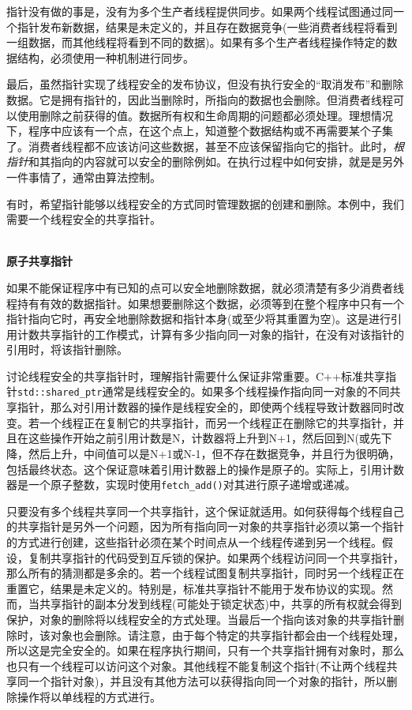 指针没有做的事是，没有为多个生产者线程提供同步。如果两个线程试图通过同一个指针发布新数据，结果是未定义的，并且存在数据竞争(一些消费者线程将看到一组数据，而其他线程将看到不同的数据)。如果有多个生产者线程操作特定的数据结构，必须使用一种机制进行同步。

最后，虽然指针实现了线程安全的发布协议，但没有执行安全的“取消发布”和删除数据。它是拥有指针的，因此当删除时，所指向的数据也会删除。但消费者线程可以使用删除之前获得的值。数据所有权和生命周期的问题都必须处理。理想情况下，程序中应该有一个点，在这个点上，知道整个数据结构或不再需要某个子集了。消费者线程都不应该访问这些数据，甚至不应该保留指向它的指针。此时，\textit{根指针}和其指向的内容就可以安全的删除例如。在执行过程中如何安排，就是是另外一件事情了，通常由算法控制。

有时，希望指针能够以线程安全的方式同时管理数据的创建和删除。本例中，我们需要一个线程安全的共享指针。

\hspace*{\fill} \\ %
\noindent
\textbf{原子共享指针}

如果不能保证程序中有已知的点可以安全地删除数据，就必须清楚有多少消费者线程持有有效的数据指针。如果想要删除这个数据，必须等到在整个程序中只有一个指针指向它时，再安全地删除数据和指针本身(或至少将其重置为空)。这是进行引用计数共享指针的工作模式，计算有多少指向同一对象的指针，在没有对该指针的引用时，将该指针删除。

讨论线程安全的共享指针时，理解指针需要什么保证非常重要。C++标准共享指针\texttt{std::shared\_ptr}通常是线程安全的。如果多个线程操作指向同一对象的不同共享指针，那么对引用计数器的操作是线程安全的，即使两个线程导致计数器同时改变。若一个线程正在复制它的共享指针，而另一个线程正在删除它的共享指针，并且在这些操作开始之前引用计数是N，计数器将上升到N+1，然后回到N(或先下降，然后上升，中间值可以是N+1或N-1，但不存在数据竞争，并且行为很明确，包括最终状态。这个保证意味着引用计数器上的操作是原子的。实际上，引用计数器是一个原子整数，实现时使用\texttt{fetch\_add()}对其进行原子递增或递减。

只要没有多个线程共享同一个共享指针，这个保证就适用。如何获得每个线程自己的共享指针是另外一个问题，因为所有指向同一对象的共享指针必须以第一个指针的方式进行创建，这些指针必须在某个时间点从一个线程传递到另一个线程。假设，复制共享指针的代码受到互斥锁的保护。如果两个线程访问同一个共享指针，那么所有的猜测都是多余的。若一个线程试图复制共享指针，同时另一个线程正在重置它，结果是未定义的。特别是，标准共享指针不能用于发布协议的实现。然而，当共享指针的副本分发到线程(可能处于锁定状态)中，共享的所有权就会得到保护，对象的删除将以线程安全的方式处理。当最后一个指向该对象的共享指针删除时，该对象也会删除。请注意，由于每个特定的共享指针都会由一个线程处理，所以这是完全安全的。如果在程序执行期间，只有一个共享指针拥有对象时，那么也只有一个线程可以访问这个对象。其他线程不能复制这个指针(不让两个线程共享同一个指针对象)，并且没有其他方法可以获得指向同一个对象的指针，所以删除操作将以单线程的方式进行。

